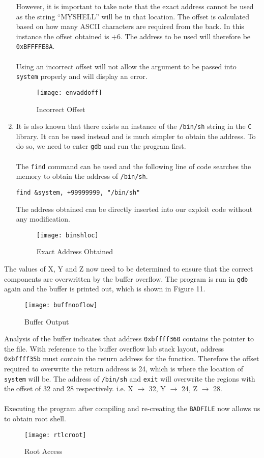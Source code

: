 \documentclass[a4paper,12pt]{article}
\begin{document}
\begin{enumerate}
\begin{enumerate}
	\end{enumerate}
However, it is important to take note that the exact address cannot be used as the string ``MYSHELL'' will be in that location. The offset is calculated based on how many ASCII characters are required from the back. In this instance the offset obtained is $+6$. The address to be used will therefore be \texttt{0xBFFFFE8A}.\\\\
Using an incorrect offset will not allow the argument to be passed into \texttt{system} properly and will display an error.
\begin{figure}[H]
	\centering
	\texttt{[image: envaddoff]}
	\caption{Incorrect Offset}
	\label{fig:envaddoff}
\end{figure}
\item It is also known that there exists an instance of the \texttt{/bin/sh} string in the \texttt{C} library. It can be used instead and is much simpler to obtain the address. To do so, we need to enter \texttt{gdb} and run the program first. \\\\The \texttt{find} command can be used and the following line of code searches the memory to obtain the address of \texttt{/bin/sh}.
\begin{verbatim}
find &system, +99999999, "/bin/sh"
\end{verbatim}
The address obtained can be directly inserted into our exploit code without any modification.
\begin{figure}[H]
	\centering
	\texttt{[image: binshloc]}
	\caption{Exact Address Obtained}
	\label{fig:binshloc}
\end{figure}

\end{enumerate}
The values of X, Y and Z now need to be determined to ensure that the correct components are overwritten by the buffer overflow. The program is run in \texttt{gdb} again and the buffer is printed out, which is shown in Figure 11.
\begin{figure}[H]
	\centering
	\texttt{[image: buffnooflow]}
	\caption{Buffer Output}
	\label{fig:buffnooflow}
\end{figure}
\noindent Analysis of the buffer indicates that address \texttt{0xbffff360} contains the pointer to the file. With reference to the buffer overflow lab stack layout, address \texttt{0xbffff35b} must contain the return address for the function. Therefore the offset required to overwrite the return address is 24, which is where the location of \texttt{system} will be. The address of \texttt{/bin/sh} and \texttt{exit} will overwrite the regions with the offset of 32 and 28 respectively. i.e. X $\rightarrow$ 32, Y $\rightarrow$ 24, Z $\rightarrow$ 28.\\\\Executing the program after compiling and re-creating the \texttt{BADFILE} now allows us to obtain root shell.
\begin{figure}[H]
	\centering
	\texttt{[image: rtlcroot]}
	\caption{Root Access}
	\label{fig:rtlcroot}
\end{figure}
\end{document}
